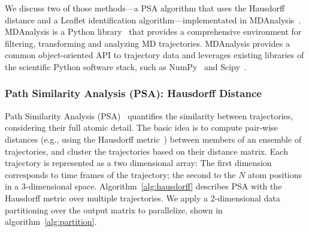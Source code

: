 We discuss two of those methods---a PSA algorithm that uses the Hausdorff
distance and a Leaflet identification algorithm---implementated in
MDAnalysis~\cite{michaud2011mdanalysis,gowers2016mdanalysis}.
MDAnalysis is a Python library~\cite{michaud2011mdanalysis,gowers2016mdanalysis}
that provides a comprehensive environment for filtering, transforming and
analyzing MD trajectories. MDAnalysis provides
a common object-oriented API to trajectory data and leverages existing libraries
of the scientific Python software stack, such as NumPy~\cite{numpy} and
Scipy~\cite{scipy}.

\subsubsection*{Path Similarity Analysis (PSA): Hausdorff Distance}

Path Similarity Analysis (PSA)~\cite{seyler2015path} quantifies the
similarity between trajectories, considering their full atomic detail. The
basic idea is to compute pair-wise distances (e.g., using the Hausdorff
metric~\cite{huttenlocher1993comparing}) between members of an ensemble of
trajectories, and cluster the trajectories based on their distance matrix. Each
trajectory is represented as a two dimensional array: The first dimension
corresponds to time frames of the trajectory; the second to the $N$ atom
positions in a 3-dimensional space. Algorithm~\ref{alg:hausdorff} describes
PSA with the Hausdorff metric over multiple trajectories. We apply a 2-dimensional
data partitioning over the output matrix to parallelize, shown in
algorithm~\ref{alg:partition}.

